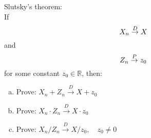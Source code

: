 
Slutsky's theorem:\\
    If 
\begin{equation}
    \label{asmp1}
    X_n \overset{D}{\rightarrow} X
\end{equation}
    and
\begin{equation}
    \label{asmp2}
    Z_n \overset{P}{\rightarrow} z_0
\end{equation}
for some constant $z_0\in \mathbb{R}$, then:
\begin{enumerate}[a)]
    \item Prove:  
        \label{Sl_add}
        $
        X_n + Z_n \overset{D}{\rightarrow} X + z_0
        $
        \\
        
    \item Prove:
        \label{Sl_mult}
        $
        X_n \cdot Z_n \overset{D}{\rightarrow} X \cdot z_0
        $
        \\
        
    \item Prove:
        \label{Sl_div}
        $
        X_n / Z_n \overset{D}{\rightarrow} X /  z_0, \quad z_0 \neq 0
        $
        \\
        
\end{enumerate}
